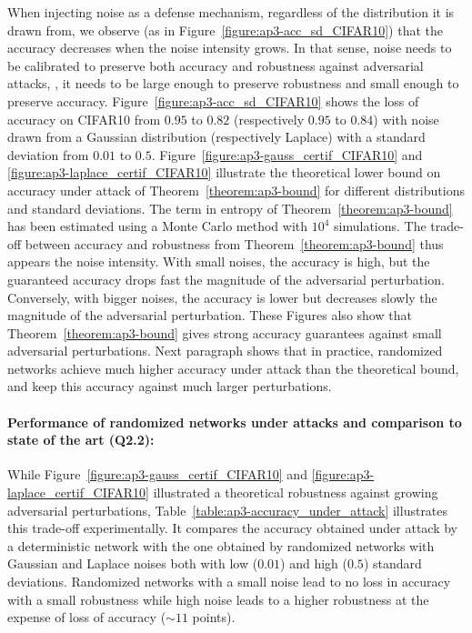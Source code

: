 When injecting noise as a defense mechanism, regardless of the distribution it is drawn from, we observe (as in Figure~\ref{figure:ap3-acc_sd_CIFAR10}) that the accuracy decreases when the noise intensity grows.
In that sense, noise needs to be calibrated to preserve both accuracy and robustness against adversarial attacks, \ie, it needs to be large enough to preserve robustness and small enough to preserve accuracy.
Figure~\ref{figure:ap3-acc_sd_CIFAR10} shows the loss of accuracy on CIFAR10 from $0.95$ to $0.82$ (respectively $0.95$ to $0.84$) with noise drawn from a Gaussian distribution (respectively Laplace) with a standard deviation from $0.01$ to $0.5$.
Figure~\ref{figure:ap3-gauss_certif_CIFAR10} and \ref{figure:ap3-laplace_certif_CIFAR10} illustrate the theoretical lower bound on accuracy under attack of Theorem~\ref{theorem:ap3-bound} for different distributions and standard deviations.
The term in entropy of Theorem~\ref{theorem:ap3-bound} has been estimated using a Monte Carlo method with $10^4$ simulations.
The trade-off between accuracy and robustness from Theorem~\ref{theorem:ap3-bound} thus appears \wrt the noise intensity.
With small noises, the accuracy is high, but the guaranteed accuracy drops fast \wrt the magnitude of the adversarial perturbation.
Conversely, with bigger noises, the accuracy is lower but decreases slowly \wrt the magnitude of the adversarial perturbation.
These Figures also show that Theorem~\ref{theorem:ap3-bound} gives strong accuracy guarantees against small adversarial perturbations.
Next paragraph shows that in practice, randomized networks achieve much higher accuracy under attack than the theoretical bound, and keep this accuracy against much larger perturbations.


\paragraph{Performance of randomized networks under attacks and comparison to state of the art (Q2.2):}

While Figure~\ref{figure:ap3-gauss_certif_CIFAR10} and \ref{figure:ap3-laplace_certif_CIFAR10} illustrated a theoretical robustness against growing adversarial perturbations, Table~\ref{table:ap3-accuracy_under_attack} illustrates this trade-off experimentally.
It compares the accuracy obtained under attack by a deterministic network with the one obtained by randomized networks with Gaussian and Laplace noises both with low ($0.01$) and high ($0.5$) standard deviations.
Randomized networks with a small noise lead to no loss in accuracy with a small robustness while high noise leads to a higher robustness at the expense of loss of accuracy ($\sim11$ points). 

